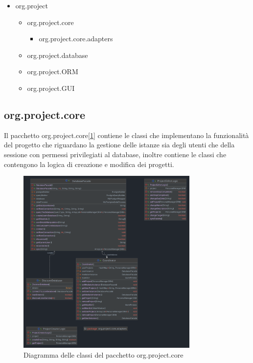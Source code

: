 \documentclass[
    10pt, %
    a4paper, %
    oneside, %
    headinclude,footinclude, %
    BCOR5mm, %
]{scrartcl}
\begin{document}
    \begin{itemize}
        \item org.project \begin{itemize}
                              \item org.project.core \begin{itemize}
                                                         \item org.project.core.adapters
                              \end{itemize}
                              \item org.project.database
                              \item org.project.ORM
                              \item org.project.GUI
        \end{itemize}
    \end{itemize}

    \subsection{org.project.core}\label{subsec:core}

    Il pacchetto org.project.core[\ref{fig:diagrammaClassiCore}] contiene le classi che implementano la funzionalità
    del progetto che riguardano la gestione delle istanze sia degli utenti che della sessione con permessi privilegiati
    al database, inoltre contiene le classi che contengono la logica di creazione e modifica dei progetti.

    \begin{figure}[tb]
        \centering
        \includegraphics[width=0.8\textwidth]{Figures/UML/CORE}
        \caption{Diagramma delle classi del pacchetto org.project.core}
        \label{fig:diagrammaClassiCore}
    \end{figure}
\end{document}
